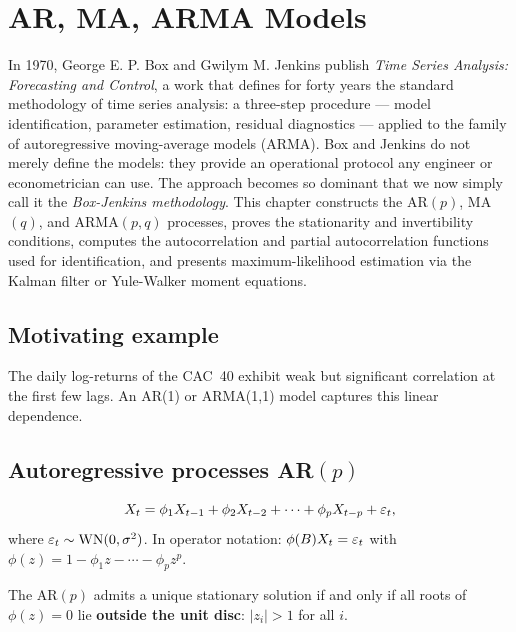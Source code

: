 \chapter{AR, MA, ARMA Models}
\label{ch:arma}

In 1970, George E. P. Box and Gwilym M. Jenkins publish \emph{Time Series Analysis: Forecasting and Control}, a work that defines for forty years the standard methodology of time series analysis: a three-step procedure --- model identification, parameter estimation, residual diagnostics --- applied to the family of autoregressive moving-average models (ARMA). Box and Jenkins do not merely define the models: they provide an operational protocol any engineer or econometrician can use. The approach becomes so dominant that we now simply call it the \emph{Box-Jenkins methodology}. This chapter constructs the AR$(p)$, MA$(q)$, and ARMA$(p,q)$ processes, proves the stationarity and invertibility conditions, computes the autocorrelation and partial autocorrelation functions used for identification, and presents maximum-likelihood estimation via the Kalman filter or Yule-Walker moment equations.

\section{Motivating example}
The daily log-returns of the CAC~40 exhibit weak but significant correlation at the first few lags. An AR(1) or ARMA(1,1) model captures this linear dependence.

\section{Autoregressive processes AR$(p)$}

\begin{definition}[AR$(p)$]
\[
X_t = \phi_1 X_{t-1} + \phi_2 X_{t-2} + \cdots + \phi_p X_{t-p} + \varepsilon_t,
\]
where $\varepsilon_t\sim\mathrm{WN}(0,\sigma^2)$. In operator notation: $\phi(B)X_t = \varepsilon_t$ with $\phi(z)=1-\phi_1 z-\cdots-\phi_p z^p$.
\end{definition}

\begin{theorem}[Stationarity of an AR$(p)$]\label{thm:ar-stat}
The AR$(p)$ admits a unique stationary solution if and only if all roots of $\phi(z)=0$ lie \textbf{outside the unit disc}: $|z_i|>1$ for all $i$.
\end{theorem}

